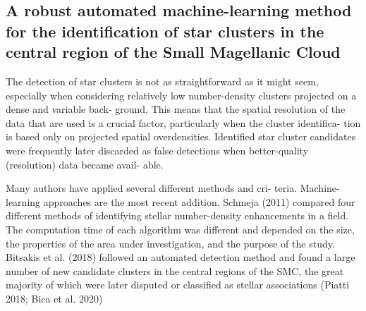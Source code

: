 \documentclass[../Main.tex]{subfiles}
\begin{document}
\subsection{A robust automated machine-learning method for the identification
of star clusters in the central region of the Small Magellanic Cloud}

The detection of star clusters is not as straightforward
as it might seem, especially when considering relatively low number-density clusters projected on a dense and variable back-
ground. This means that the spatial resolution of the data that are
used is a crucial factor, particularly when the cluster identifica-
tion is based only on projected spatial overdensities. Identified
star cluster candidates were frequently later discarded as false
detections when better-quality (resolution) data became avail-
able. 

Many authors have applied several diﬀerent methods and cri-
teria. Machine-learning approaches are the most recent addition.
Schmeja (2011) compared four diﬀerent methods of identifying
stellar number-density enhancements in a field. The computation
time of each algorithm was diﬀerent and depended on the size,
the properties of the area under investigation, and the purpose of
the study. Bitsakis et al. (2018) followed an automated detection
method and found a large number of new candidate clusters in
the central regions of the SMC, the great majority of which were
later disputed or classified as stellar associations (Piatti 2018;
Bica et al. 2020)
\end{document}
